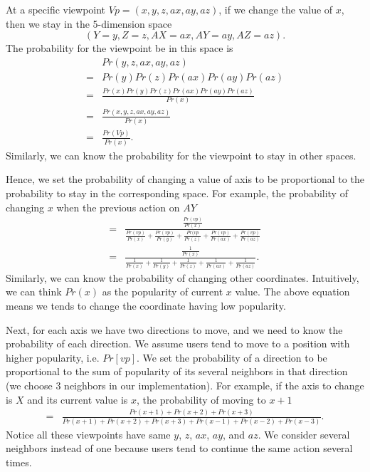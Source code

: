 At a specific viewpoint $Vp = (x, y, z, ax, ay, az)$, if we change the value of $x$, 
then we stay in the 5-dimension space
\[
    (Y=y, Z=z, AX=ax, AY=ay, AZ=az).
\]
The probability for the viewpoint be in this space is 
\begin{align*}
    &Pr(y, z, ax, ay, az)\\
    =&Pr(y)Pr(z)Pr(ax)Pr(ay)Pr(az)\\
    =&\frac{Pr(x)Pr(y)Pr(z)Pr(ax)Pr(ay)Pr(az)}{Pr(x)}\\
    =&\frac{Pr(x, y, z, ax, ay, az)}{Pr(x)}\\
    =&\frac{Pr(Vp)}{Pr(x)}.
\end{align*}
Similarly, we can know the probability for the viewpoint to stay in other spaces. 

Hence, we set the probability of changing a value of axis to be proportional to the probability to stay in the
corresponding space. For example, the probability of changing $x$ when the previous action on $AY$
\begin{align*}
    =&\frac{\frac{Pr(vp)}{Pr(x)}}
            {\frac{Pr(vp)}{Pr(x)}
            +\frac{Pr(vp)}{Pr(y)}
            +\frac{Pr(vp}{Pr(z)}
            +\frac{Pr(vp)}{Pr(ax)}
            +\frac{Pr(vp)}{Pr(az)}}\\
    =& \frac{\frac{1}{Pr(x)}}
            {\frac{1}{Pr(x)}
            +\frac{1}{Pr(y)}
            +\frac{1}{Pr(z)}
            +\frac{1}{Pr(ax)}
            +\frac{1}{Pr(az)}
            }.
\end{align*}
Similarly, we can know the probability of changing other coordinates. Intuitively, we can think $Pr(x)$ as 
the popularity of current $x$ value. The above equation means we tends to change the coordinate having low
popularity.


Next, for each axis we have two directions to move, and we need to know the probability of each direction.
We assume users tend to move to a position with higher popularity, i.e. $Pr[vp]$. We set the probability 
of a direction to be proportional to the sum of popularity of its several neighbors in that direction (we choose
3 neighbors in our implementation). 
For example, if the axis to change is $X$ and its current value is $x$, 
the probability of moving to $x+1$  
\begin{align*}
   =&\frac{Pr(x+1)+Pr(x+2)+Pr(x+3)}
          {Pr(x+1)+Pr(x+2)+Pr(x+3)+Pr(x-1)+Pr(x-2)+Pr(x-3)}.
\end{align*}
Notice all these viewpoints have same $y$, $z$, $ax$, $ay$, and $az$.
We consider several neighbors instead of one because users tend to continue 
the same action several times. 

